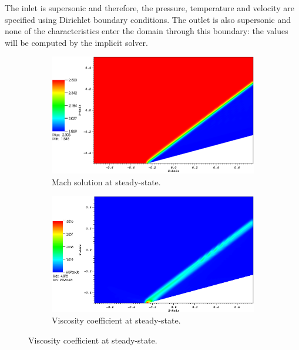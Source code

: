 \documentclass[preprint,10pt]{elsarticle}
\begin{document}
The inlet is supersonic and therefore, the pressure, temperature and velocity are specified using Dirichlet boundary conditions. The outlet is also supersonic and none of the characteristics enter the domain through this boundary: the values will be computed by the implicit solver.
\begin{figure}[H]
        \centering
        \begin{subfigure}[b]{0.52\textwidth}
                \centering
                \includegraphics[width=\textwidth]{CompressionCorner2D_mach.png}
                \caption{Mach solution at steady-state.}
                \label{fig:2d_corner_mach}
        \end{subfigure}%
        \begin{subfigure}[b]{0.52\textwidth}
                \centering
                \includegraphics[width=\textwidth]{CompressionCorner2D_viscosity.png}
                \caption{Viscosity coefficient at steady-state.}
                \label{fig:2d_corner_visc}
        \end{subfigure}
        

\end{figure}
\end{document}
